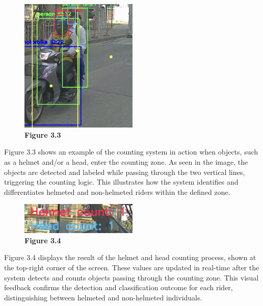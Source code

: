 	\begin{figure}[H] %
		\centering
		\includegraphics[width=0.5\textwidth]{headhel2.png}
		\vspace{0.5em}
		\caption*{\textbf{Figure 3.3}}
	\end{figure}
	
	\noindent\hspace{2.5em}Figure 3.3 shows an example of the counting system in action when objects, such as a helmet and/or a head, enter the counting zone. As seen in the image, the objects are detected and labeled while passing through the two vertical lines, triggering the counting logic. This illustrates how the system identifies and differentiates helmeted and non-helmeted riders within the defined zone.
	
	\begin{figure}[H] %
		\centering
		\includegraphics[width=0.5\textwidth]{headhel3.png}
		\vspace{0.5em}
		\caption*{\textbf{Figure 3.4}}
	\end{figure}
	
		\noindent\hspace{2.5em}Figure 3.4 displays the result of the helmet and head counting process, shown at the top-right corner of the screen. These values are updated in real-time after the system detects and counts objects passing through the counting zone. This visual feedback confirms the detection and classification outcome for each rider, distinguishing between helmeted and non-helmeted individuals.
	
